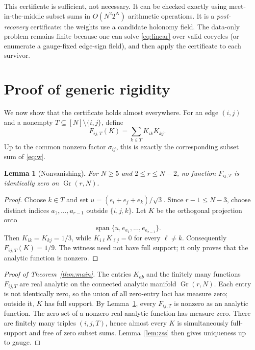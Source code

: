 \documentclass[11pt,a4paper]{article}
\newtheorem{lemma}[theorem]{Lemma}
\theoremstyle{definition}
\theoremstyle{remark}
\newcommand{\Gr}{\operatorname{Gr}}
\begin{document}
This certificate is sufficient, not necessary.  It can be checked exactly using
meet-in-the-middle subset sums in $O(N^2 2^N)$ arithmetic operations.  It is a
\emph{post-recovery} certificate: the weights use a candidate holonomy field.  The data-only
problem remains finite because one can solve \eqref{eq:linear} over valid cocycles (or
enumerate a gauge-fixed edge-sign field), and then apply the certificate to each survivor.

\section{Proof of generic rigidity}

We now show that the certificate holds almost everywhere.  For an edge $(i,j)$ and a
nonempty $T\subseteq[N]\setminus\{i,j\}$, define
\begin{equation}
 F_{ij,T}(K)=\sum_{k\in T}K_{ik}K_{kj}.
 \label{eq:F}
\end{equation}
Up to the common nonzero factor $\sigma_{ij}$, this is exactly the corresponding subset sum
of \eqref{eq:w}.

\begin{lemma}[Nonvanishing]\label{lem:nv}
For $N\ge5$ and $2\le r\le N-2$, no function $F_{ij,T}$ is identically zero on
$\Gr(r,N)$.
\end{lemma}

\begin{proof}
Choose $k\in T$ and set $u=(e_i+e_j+e_k)/\sqrt3$.  Since $r-1\le N-3$, choose distinct
indices $a_1,\ldots,a_{r-1}$ outside $\{i,j,k\}$.  Let $K$ be the orthogonal projection
onto
\[
 \operatorname{span}\{u,e_{a_1},\ldots,e_{a_{r-1}}\}.
\]
Then $K_{ik}=K_{kj}=1/3$, while $K_{i\ell}K_{\ell j}=0$ for every $\ell\ne k$.
Consequently $F_{ij,T}(K)=1/9$.  The witness need not have full support; it only proves
that the analytic function is nonzero.
\end{proof}

\begin{proof}[Proof of Theorem~\ref{thm:main}]
The entries $K_{ab}$ and the finitely many functions $F_{ij,T}$ are real analytic on the
connected analytic manifold $\Gr(r,N)$.  Each entry is not identically zero, so the union
of all zero-entry loci has measure zero; outside it, $K$ has full support.  By
Lemma~\ref{lem:nv}, every $F_{ij,T}$ is nonzero as an analytic function.  The zero set of a
nonzero real-analytic function has measure zero.  There are finitely many triples
$(i,j,T)$, hence almost every $K$ is simultaneously full-support and free of zero subset
sums.  Lemma~\ref{lem:zss} then gives uniqueness up to gauge.
\end{proof}
\end{document}
